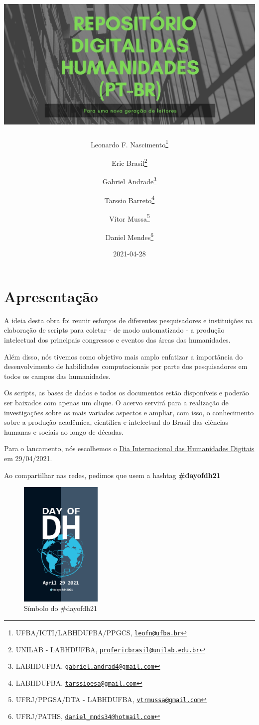 \documentclass[
]{book}
\title{\includegraphics[width=1\textwidth,height=\textheight]{./img/logo.jpg}}
\author{Leonardo F. Nascimento\footnote{UFBA/ICTI/LABHDUFBA/PPGCS, \href{mailto:leofn@ufba.br}{\nolinkurl{leofn@ufba.br}}} \and Eric Brasil\footnote{UNILAB - LABHDUFBA, \href{mailto:profericbrasil@unilab.edu.br}{\nolinkurl{profericbrasil@unilab.edu.br}}} \and Gabriel Andrade\footnote{LABHDUFBA, \href{mailto:gabriel.andrad4@gmail.com}{\nolinkurl{gabriel.andrad4@gmail.com}}} \and Tarssio Barreto\footnote{LABHDUFBA, \href{mailto:tarssioesa@gmail.com}{\nolinkurl{tarssioesa@gmail.com}}} \and Vítor Mussa\footnote{UFRJ/PPGSA/DTA - LABHDUFBA, \href{mailto:vtrmussa@gmail.com}{\nolinkurl{vtrmussa@gmail.com}}} \and Daniel Mendes\footnote{UFRJ/PATHS, \href{mailto:daniel_mnds34@hotmail.com}{\nolinkurl{daniel\_mnds34@hotmail.com}}}}
\date{2021-04-28}
\begin{document}
\maketitle

{
\setcounter{tocdepth}{1}
\tableofcontents
}
\hypertarget{apresentauxe7uxe3o}{%
\chapter{Apresentação}\label{apresentauxe7uxe3o}}

A ideia desta obra foi reunir esforços de diferentes pesquisadores e instituições na elaboração de scripts para coletar - de modo automatizado - a produção intelectual dos principais congressos e eventos das áreas das humanidades.

Além disso, nós tivemos como objetivo mais amplo enfatizar a importância do desenvolvimento de habilidades computacionais por parte dos pesquisadores em todos os campos das humanidades.

Os scripts, as bases de dados e todos os documentos estão disponíveis e poderão ser baixados com apenas um clique. O acervo servirá para a realização de investigações sobre os mais variados aspectos e ampliar, com isso, o conhecimento sobre a produção acadêmica, científica e intelectual do Brasil das ciências humanas e sociais ao longo de décadas.

Para o lancamento, nós escolhemos o \href{https://dhcenternet.org/initiatives/day-of-dh/2021}{Dia Internacional das Humanidades Digitais} em 29/04/2021.

Ao compartilhar nas redes, pedimos que usem a hashtag \textbf{\#dayofdh21}

\begin{figure}
\centering
\includegraphics[width=0.35\textwidth,height=\textheight]{./img/dayofdh.jpg}
\caption{Símbolo do \#dayofdh21}
\end{figure}
\end{document}
